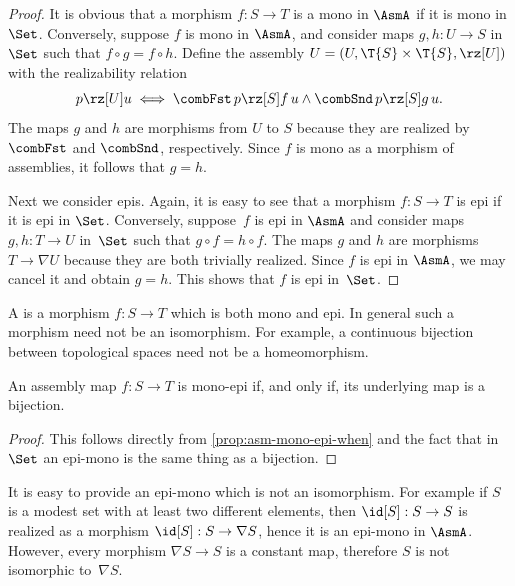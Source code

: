\begin{proof}
  It is obvious that a morphism $f : S \to T$ is a mono in
  $\AsmA$ if it is mono in $\Set$. Conversely, suppose $f$ is mono in
  $\AsmA$, and consider maps $g, h : U \to S$ in $\Set$ such that $f
  \circ g = f \circ h$. Define the assembly $U = (U, \T{S} \times
  \T{S}, {\rz[U]})$ with the realizability relation
  \begin{equation*}
    p \rz[U] u
    \iff \combFst\,p \rz[S] f\,u \land \combSnd\,p \rz[S] g\,u.
  \end{equation*}
  The maps $g$ and $h$ are morphisms from $U$ to $S$
  because they are realized by $\combFst$ and $\combSnd$,
  respectively. Since $f$ is mono as a morphism of assemblies, it
  follows that $g = h$.

  Next we consider epis. Again, it is easy to see that a morphism
  $f : S \to T$ is epi if it is epi in $\Set$. Conversely, suppose~$f$ is epi
  in $\AsmA$ and consider maps $g, h : T \to U$ in~$\Set$ such that
  $g \circ f = h \circ f$. The maps $g$ and $h$ are morphisms $T \to \nabla U$ because
  they are both trivially realized. Since $f$ is epi in $\AsmA$, we may cancel it and
  obtain $g = h$. This shows that $f$ is epi in~$\Set$.
\end{proof}

A  is a morphism $f : S \to T$ which is both mono and
epi. In general such a morphism need not be an isomorphism. For
example, a continuous bijection between topological spaces need not be
a homeomorphism.

\begin{corollary}
  An assembly map $f : S \to T$ is mono-epi if, and only
  if, its underlying map is a bijection.
\end{corollary}

\begin{proof}
  This follows directly from \cref{prop:asm-mono-epi-when}
  and the fact that in $\Set$ an epi-mono is the same thing as a
  bijection.
\end{proof}

It is easy to provide an epi-mono which is not an isomorphism. For
example if $S$ is a modest set with at least two different
elements, then $\id[S] : S \to S$ is realized as a morphism $\id[S] :
S \to \nabla S$, hence it is an epi-mono in $\AsmA$. However,
every morphism $\nabla S \to S$ is a constant map, therefore
$S$ is not isomorphic to~$\nabla{S}$.

